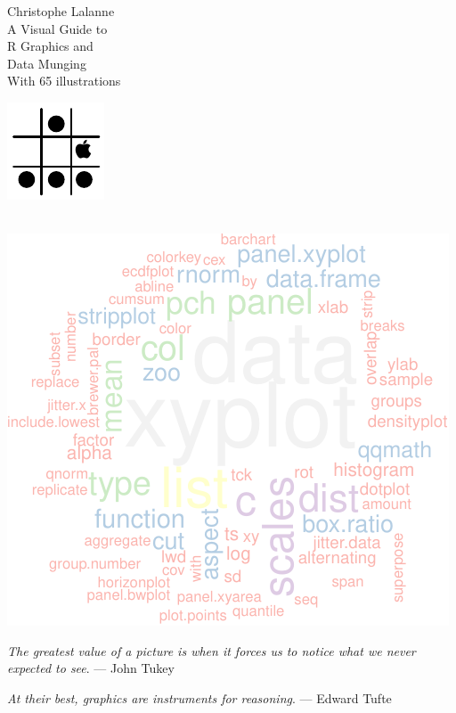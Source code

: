 \documentclass[a4paper,twoside]{book}
\newlength{\tpheight}\setlength{\tpheight}{0.9\textheight}
\newlength{\txtheight}\setlength{\txtheight}{0.9\tpheight}
\begin{document}
\pagestyle{empty}

\begingroup%
\raggedleft
\vspace*{\baselineskip}
{\Large\textsf{Christophe Lalanne}}\\[0.167\txtheight]
{\Large\titlefont A Visual Guide to}\\[\baselineskip]
{\textcolor{Medium}{\Huge\titlefont R Graphics and}}\\[\baselineskip]
{\textcolor{Medium}{\Huge\titlefont Data Munging}}\\[\baselineskip]
{\tiny\titlefont With 65 illustrations}\par
\vfill
{\includegraphics[scale=.75]{logo}\\{\small \tt \GITAbrHash}\\{\small %
    \tt \VCDateTEX}}\par 
\vspace*{3\baselineskip}
\endgroup
\pagestyle{empty}
\cleardoublepage

\frontmatter
\pagestyle{empty}
\vspace*{\fill}
\centerline{\includegraphics[width=.6\textwidth]{wcindex}}
\vspace*{3\baselineskip}
\hfill{\footnotesize \emph{The greatest value of a picture is when it forces us to notice what we
never expected to see}. --- John Tukey}

\hfill{\footnotesize \emph{At their best, graphics are instruments for reasoning}. --- Edward Tufte}
\vspace*{\fill}
\cleardoublepage
{}
\tableofcontents
\end{document}
